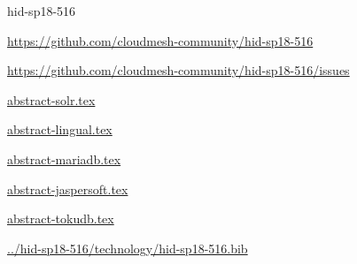 \begin{IU}

hid-sp18-516

\url{https://github.com/cloudmesh-community/hid-sp18-516}

\url{https://github.com/cloudmesh-community/hid-sp18-516/issues}

\href{https://github.com/cloudmesh-community/hid-sp18-516/blob/master//technology/abstract-solr.tex}{abstract-solr.tex}

\href{https://github.com/cloudmesh-community/hid-sp18-516/blob/master//technology/abstract-lingual.tex}{abstract-lingual.tex}

\href{https://github.com/cloudmesh-community/hid-sp18-516/blob/master//technology/abstract-mariadb.tex}{abstract-mariadb.tex}

\href{https://github.com/cloudmesh-community/hid-sp18-516/blob/master//technology/abstract-jaspersoft.tex}{abstract-jaspersoft.tex}

\href{https://github.com/cloudmesh-community/hid-sp18-516/blob/master//technology/abstract-tokudb.tex}{abstract-tokudb.tex}

\href{https://github.com/cloudmesh-community/hid-sp18-516/blob/master//technology/hid-sp18-516.bib}{../hid-sp18-516/technology/hid-sp18-516.bib}

\end{IU}


